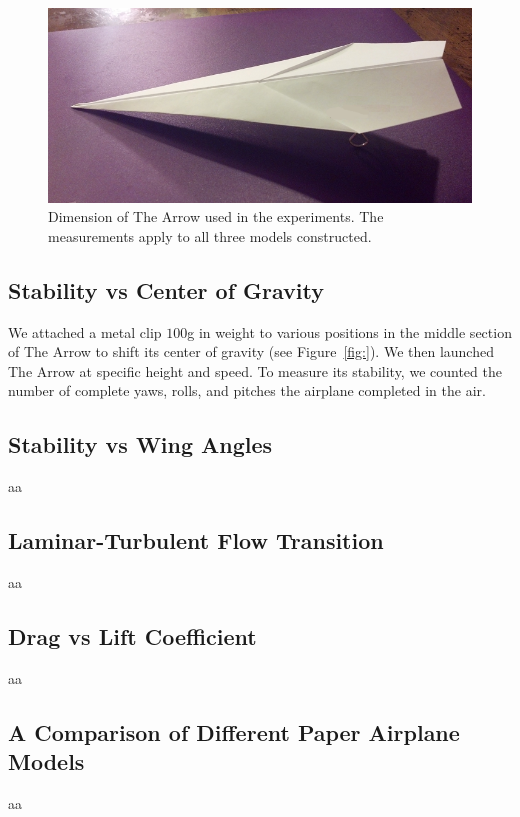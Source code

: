 \begin{figure}[hl]
  \centering
    \includegraphics[scale=0.7]{figures/arrowdimension.png}
    \caption{Dimension of The Arrow used in the experiments. The measurements apply to all three models constructed.}
  \label{fig:arrowdimension}
\end{figure}


\subsection{Stability vs Center of Gravity}
We attached a metal clip $100$g in weight to various positions in the middle section of The Arrow to shift its center 
of gravity (see Figure~\ref{fig:}). We then launched The Arrow at specific height and speed. To measure its stability, we counted the 
number of complete yaws, rolls, and pitches the airplane completed in the air.  


\subsection{Stability vs Wing Angles}
aa
\subsection{Laminar-Turbulent Flow Transition}
aa
\subsection{Drag vs Lift Coefficient}
aa
\subsection{A Comparison of Different Paper Airplane Models}
aa